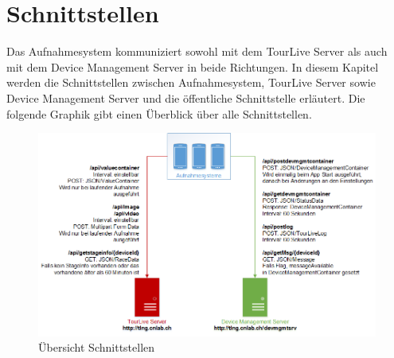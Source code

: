 \chapter{Schnittstellen}

Das Aufnahmesystem kommuniziert sowohl mit dem TourLive Server als auch mit dem Device Management Server in beide Richtungen. In diesem Kapitel werden die Schnittstellen zwischen Aufnahmesystem, TourLive Server sowie Device Management Server und die öffentliche Schnittstelle erläutert. Die folgende Graphik gibt einen Überblick über alle Schnittstellen.

\begin{figure}[H]
	\centering
	\includegraphics[width=150mm]{images/uebersicht_schnittstelle.png}
	\caption{Übersicht Schnittstellen}
\end{figure}


